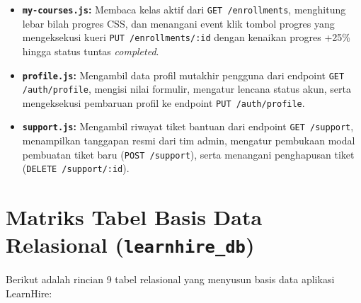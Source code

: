 \documentclass[11pt,a4paper]{article}
\begin{document}
\begin{itemize}[leftmargin=*]
    \item \textbf{\texttt{my-courses.js}:} Membaca kelas aktif dari \texttt{GET /enrollments}, menghitung lebar bilah progres CSS, dan menangani event klik tombol progres yang mengeksekusi kueri \texttt{PUT /enrollments/:id} dengan kenaikan progres +25\% hingga status tuntas \textit{completed}.
    \item \textbf{\texttt{profile.js}:} Mengambil data profil mutakhir pengguna dari endpoint \texttt{GET /auth/profile}, mengisi nilai formulir, mengatur lencana status akun, serta mengeksekusi pembaruan profil ke endpoint \texttt{PUT /auth/profile}.
    \item \textbf{\texttt{support.js}:} Mengambil riwayat tiket bantuan dari endpoint \texttt{GET /support}, menampilkan tanggapan resmi dari tim admin, mengatur pembukaan modal pembuatan tiket baru (\texttt{POST /support}), serta menangani penghapusan tiket (\texttt{DELETE /support/:id}).
\end{itemize}

\newpage

\section{Matriks Tabel Basis Data Relasional (\texttt{learnhire\_db})}

Berikut adalah rincian 9 tabel relasional yang menyusun basis data aplikasi LearnHire:
\end{document}
